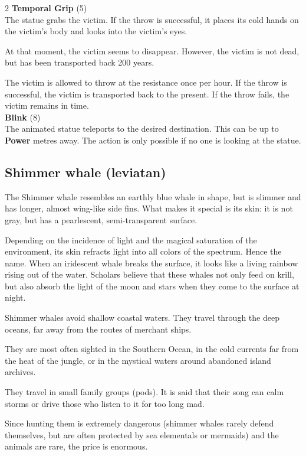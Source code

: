 \begin{multicols}{2}
    \textbf{Temporal Grip} (5)\\
    The statue grabs the victim. If the throw is successful, it places its cold hands on the victim's body and looks into the victim's eyes.

At that moment, the victim seems to disappear. However, the victim is not dead, but has been transported back 200 years. 

The victim is allowed to throw at the resistance once per hour. If the throw is successful, the victim is transported back to the present. If the throw fails, the victim remains in time.\\
    \textbf{Blink} (8)\\
    The animated statue teleports to the desired destination. This can be up to \textbf{Power} metres away. The action is only possible if no one is looking at the statue.\\


    \subsection*{Shimmer whale (leviatan)}

    The Shimmer whale resembles an earthly blue whale in shape, but is slimmer and has longer, almost wing-like side fins. What makes it special is its skin: it is not gray, but has a pearlescent, semi-transparent surface.

Depending on the incidence of light and the magical saturation of the environment, its skin refracts light into all colors of the spectrum. Hence the name. When an iridescent whale breaks the surface, it looks like a living rainbow rising out of the water.
Scholars believe that these whales not only feed on krill, but also absorb the light of the moon and stars when they come to the surface at night.

Shimmer whales avoid shallow coastal waters. They travel through the deep oceans, far away from the routes of merchant ships.

They are most often sighted in the Southern Ocean, in the cold currents far from the heat of the jungle, or in the mystical waters around abandoned island archives.

They travel in small family groups (pods). It is said that their song can calm storms or drive those who listen to it for too long mad.

Since hunting them is extremely dangerous (shimmer whales rarely defend themselves, but are often protected by sea elementals or mermaids) and the animals are rare, the price is enormous.


\end{multicols}
